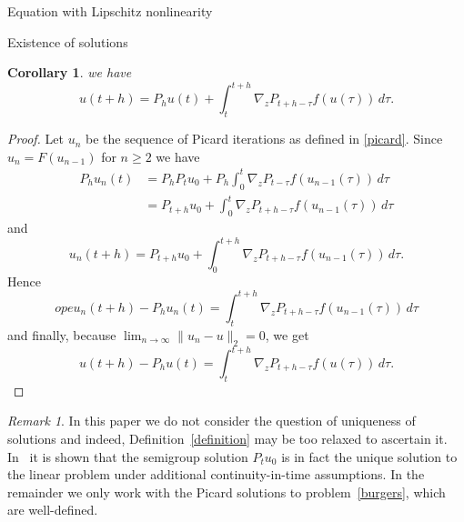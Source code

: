 \documentclass[a4paper,10pt,fleqn]{amsart}
\newtheorem{corollary}[theorem]{Corollary}
\theoremstyle{remark}
\newtheorem{remark}[theorem]{Remark}
\theoremstyle{definition}
\newcommand{\grad} {\nabla_{\!z}}
\renewcommand{\=} {\overset{d}{=}}
\begin{document}
\begin{section}{Equation with Lipschitz nonlinearity}
\begin{subsection}{Existence of solutions}
\begin{corollary}
      we have
      \begin{equation*}
          u(t+h) = P_hu(t)+\int_t^{t+h}\grad P_{t+h-\tau}f(u(\tau))\,d\tau.
      \end{equation*}
  \end{corollary}
  \begin{proof}
   Let $u_n$ be the sequence of Picard iterations as defined in \eqref{picard}.
   Since $u_{n} = F(u_{n-1})$ for $n\geq 2$ we have
   \begin{align*}
    P_hu_n(t) &= P_hP_tu_0 + P_h\int_0^t\grad P_{t-\tau}f(u_{n-1}(\tau))\,d\tau\\
        &= P_{t+h}u_0 + \int_0^t\grad P_{t+h-\tau}f(u_{n-1}(\tau))\,d\tau
   \end{align*}
    and
    \begin{equation*}
     u_n(t+h) = P_{t+h}u_0 + \int_0^{t+h}\grad P_{t+h-\tau}f(u_{n-1}(\tau))\,d\tau.
    \end{equation*}
    Hence
    \begin{equation*}ope
     u_n(t+h) - P_hu_n(t) = \int_t^{t+h}\grad P_{t+h-\tau}f(u_{n-1}(\tau))\,d\tau
    \end{equation*}
    and finally, because $\lim_{n\to\infty} \|u_n -u\|_2 =0$, we get
    \begin{equation*}
     u(t+h) - P_hu(t) = \int_t^{t+h}\grad P_{t+h-\tau}f(u(\tau))\,d\tau.
    \end{equation*}
  \end{proof}
  \begin{remark}\label{uniqueness-remark}
   In this paper we do not consider the question of uniqueness of solutions and
   indeed, Definition~\ref{definition} may be too relaxed to ascertain it.
   In~\cite{MR3628179} it is shown that the semigroup solution $P_tu_0$ is
   in fact the unique solution to the linear problem under additional
   continuity-in-time assumptions. In the remainder we only work with
   the Picard solutions to problem~\eqref{burgers}, which are well-defined.
  \end{remark}
    \end{subsection}
\end{section}
\end{document}
